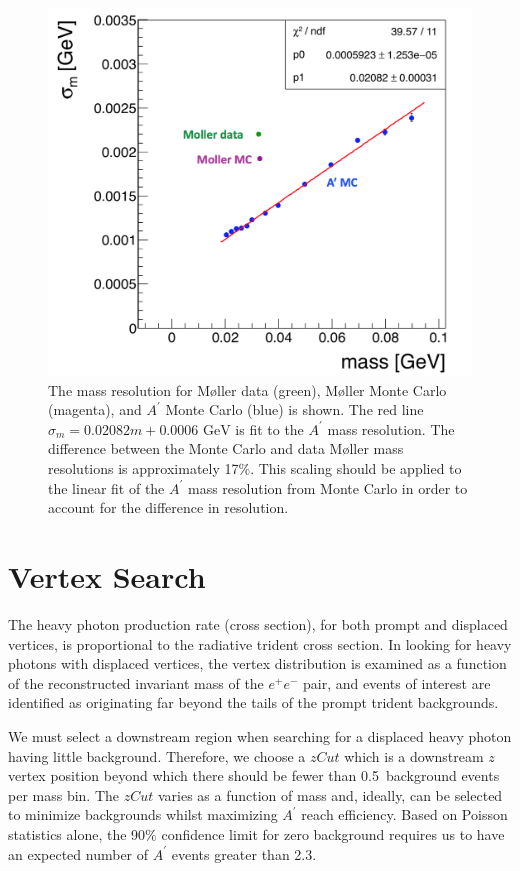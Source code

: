 \documentclass[twocolumn, showpacs, preprintnumbers,prd, superscriptaddress]{revtex4-1}
\begin{document}
        \begin{figure}[th]
            \centering
            \includegraphics[width=.9\linewidth]{figs/massResolution.png}
            \caption{
                The mass resolution for M\o ller data (green), M\o ller Monte Carlo (magenta), and $A^{\prime}$ Monte Carlo (blue) is shown. The red line $\sigma_m = 0.02082m+0.0006\textrm{ GeV}$ is fit to the $A^{\prime}$ mass resolution. The difference between the Monte Carlo and data M\o ller mass resolutions is approximately 17$\%$. This scaling should be applied to the linear fit of the $A^{\prime}$ mass resolution from Monte Carlo in order to account for the difference in resolution.}
            \label{fig:massres}
        \end{figure}

    \section{Vertex Search}\label{sec:vertex}
       
        The heavy photon production rate (cross section), for both prompt and displaced vertices, is proportional to the radiative trident cross section. In looking for heavy photons with displaced vertices, the vertex distribution is examined as a function of the reconstructed invariant mass of the $e^+e^-$ pair, and events of interest are identified as originating far beyond the tails of the prompt trident backgrounds. 

We must select a downstream region when searching for a displaced heavy photon having little background. Therefore, we choose a $zCut$ which is a downstream $z$ vertex position beyond which there should be fewer than 0.5~background events per mass bin. The $zCut$ varies as a function of mass and, ideally, can be selected to minimize backgrounds whilst maximizing $A^{\prime}$ reach efficiency. Based on Poisson statistics alone, the 90$\%$ confidence limit for zero background requires us to have an expected number of $A^{\prime}$ events greater than 2.3.\\
\end{document}
